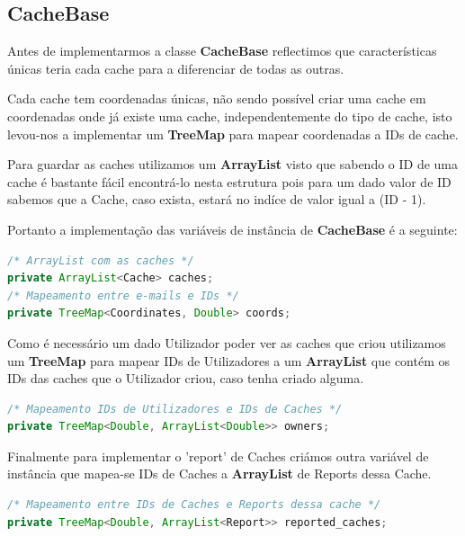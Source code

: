 \documentclass{article}
\begin{document}
\subsection{CacheBase}
\par Antes de implementarmos a classe \textbf{CacheBase} reflectimos que características únicas teria cada cache para a
diferenciar de todas as outras.
\par Cada cache tem coordenadas únicas, não sendo possível criar uma cache em coordenadas onde já existe uma cache,
independentemente do tipo de cache, isto levou-nos a implementar um \textbf{TreeMap} para mapear coordenadas a
IDs de cache.
\par Para guardar as caches utilizamos um \textbf{ArrayList} visto que sabendo o ID de uma cache é bastante fácil encontrá-lo
nesta estrutura pois para um dado valor de ID sabemos que a Cache, caso exista, estará no indíce de valor igual a (ID - 1).
\par Portanto a implementação das variáveis de instância de \textbf{CacheBase} é a seguinte:
\begin{lstlisting}[language=Java]
/* ArrayList com as caches */
private ArrayList<Cache> caches;
/* Mapeamento entre e-mails e IDs */
private TreeMap<Coordinates, Double> coords;
\end{lstlisting}

\par Como é necessário um dado Utilizador poder ver as caches que criou utilizamos um \textbf{TreeMap} para mapear
IDs de Utilizadores a um \textbf{ArrayList} que contém os IDs das caches que o Utilizador criou, caso tenha criado alguma.
\begin{lstlisting}[language=Java]
/* Mapeamento IDs de Utilizadores e IDs de Caches */
private TreeMap<Double, ArrayList<Double>> owners;
\end{lstlisting}

\par Finalmente para implementar o 'report' de Caches criámos outra variável de instância que mapea-se IDs de Caches
a \textbf{ArrayList} de Reports dessa Cache.
\begin{lstlisting}[language=Java]
/* Mapeamento entre IDs de Caches e Reports dessa cache */
private TreeMap<Double, ArrayList<Report>> reported_caches;
\end{lstlisting}

\newpage
\end{document}
